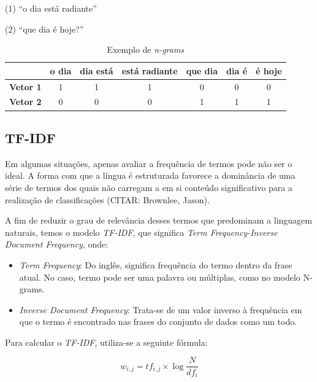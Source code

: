 \begin{samepage}
(1) “o dia está radiante”

\nopagebreak

(2) “que dia é hoje?”
\end{samepage}

\begin{center}
\begin{table}[htbp]
\centering
\begin{tabular}{c|cccccc}
 & \textbf{o dia} & \textbf{dia está} & \textbf{está radiante} & \textbf{que dia} & \textbf{dia é} & \textbf{é hoje} \\ \hline
\textbf{Vetor 1} & 1 & 1 & 1 & 0 & 0 & 0 \\
\textbf{Vetor 2} & 0 & 0 & 0 & 1 & 1 & 1
\end{tabular}
\caption{Exemplo de \textit{n-grams}}
\label{ngrams}
\end{table}
\end{center}

\subsection{TF-IDF}

Em algumas situações, apenas avaliar a frequência de termos pode não ser o ideal. A forma com que a língua é estruturada favorece a dominância de uma série de termos dos quais não carregam a em si conteúdo significativo para a realização de classificações (CITAR: Brownlee, Jason).

A fim de reduzir o grau de relevância desses termos que predominam a linguagem naturais, temos o modelo \textit{TF-IDF}, que significa \textit{Term Frequency-Inverse Document Frequency}, onde:

\begin{itemize}
\item \textit{Term Frequency}: Do inglês, significa frequência do termo dentro da frase atual. No caso, termo pode ser uma palavra ou múltiplas, como no modelo N-grams.
\item \textit{Inverse Document Frequency}: Trata-se de um valor inverso à frequência em que o termo é encontrado nas frases do conjunto de dados como um todo.
\end{itemize}

Para calcular o \textit{TF-IDF}, utiliza-se a seguinte fórmula:

\begin{equation}
w_{i,j} = tf_{i,j}\times\log \frac{N}{df_i}
\end{equation}

